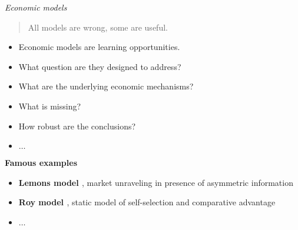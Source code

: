 \begin{frame}\begin{center}
		\LARGE\textit{Economic models}
\end{center}\end{frame}
\begin{frame}\begin{quote}
All models are wrong, some are useful.
\end{quote}\end{frame}
\begin{frame}

\begin{itemize}\setlength\itemsep{1em}
\item Economic models are learning opportunities.
\item What question are they designed to address?
\item What are the underlying economic mechanisms?
\item What is missing?
\item How robust are the conclusions?
\item $\hdots$
\end{itemize}

\end{frame}
\begin{frame}\textbf{Famous examples}\vspace{0.3cm}

\begin{itemize}\setlength\itemsep{1em}
\item \textbf{Lemons model \cite{Akerlof.1970}}, market unraveling in presence of asymmetric information
\item \textbf{Roy model \cite{Roy.1951}}, static model of self-selection and comparative advantage
\item $\hdots$
\end{itemize}

\end{frame}
